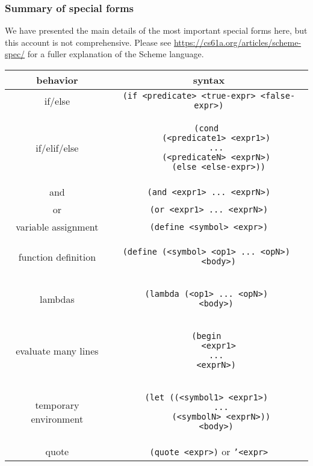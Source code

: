 \subsubsection{Summary of special forms}
We have presented the main details of the most important special forms here, but this account is not comprehensive. Please see \url{https://cs61a.org/articles/scheme-spec/} for a fuller explanation of the Scheme language. 
\vspace{0.2in}
\begin{center}
\begin{tabular}{ |c|c| }
    \hline
    behavior & syntax \\
    \hline
    if/else & \texttt{(if <predicate> <true-expr> <false-expr>)}  \\
    \hline
    if/elif/else  
& \begin{lstlisting}
(cond 
    (<predicate1> <expr1>) 
    ... 
    (<predicateN> <exprN>) 
    (else <else-expr>))
\end{lstlisting} \\
    \hline
    and & \texttt{(and <expr1> ... <exprN>)} \\
    \hline
    or & \texttt{(or <expr1> ... <exprN>)} \\
    \hline
    variable assignment   & \texttt{(define <symbol> <expr>)} \\
    \hline
    function definition & 
\begin{lstlisting}
(define (<symbol> <op1> ... <opN>) 
    <body>)
\end{lstlisting}  \\
    \hline
    lambdas & 
\begin{lstlisting} 
(lambda (<op1> ... <opN>) 
    <body>) 
\end{lstlisting} \\
\hline
    evaluate many lines & 
\begin{lstlisting}
(begin 
    <expr1>
    ... 
    <exprN>) 
\end{lstlisting} \\
    \hline
    temporary environment & 
\begin{lstlisting} 
(let ((<symbol1> <expr1>) 
      ... 
      (<symbolN> <exprN>)) 
    <body>) 
\end{lstlisting}\\
    \hline
    quote & \texttt{(quote <expr>)} or \texttt{'<expr>}  \\
    \hline
\end{tabular}
\end{center}